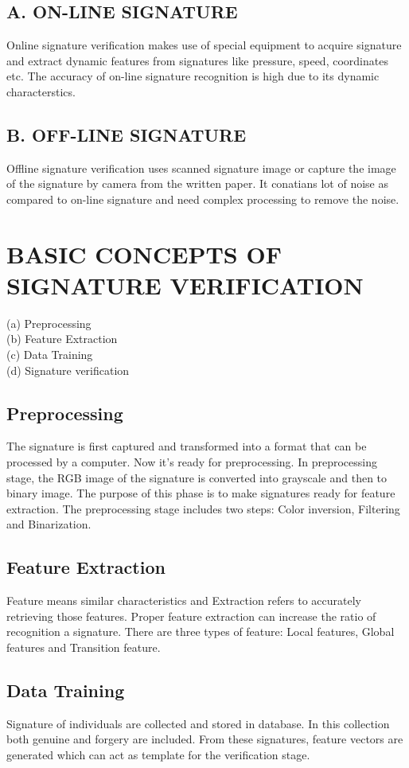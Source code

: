 \documentclass[]{article}
\begin{document}
	\subsection*{A. ON-LINE SIGNATURE}
	Online signature verification
	makes use of special equipment to acquire signature and
	extract dynamic features from signatures like pressure, speed, coordinates etc\cite{bib1}. The accuracy of on-line signature recognition is high due to its dynamic characterstics.
	\subsection*{B. OFF-LINE SIGNATURE}
	Offline signature verification uses scanned signature image or capture the image of the signature by camera from the written paper. It conatians lot of  noise as compared to on-line signature and need complex processing to remove the noise.
	\section{BASIC CONCEPTS OF SIGNATURE VERIFICATION}
	(a) Preprocessing\\
	(b) Feature Extraction\\
	(c) Data Training\\
	(d) Signature verification\\
	\subsection{Preprocessing\cite{bib2}}
	The signature is first captured and transformed into a format that can be processed by a computer. Now it’s ready for preprocessing. In preprocessing stage, the RGB image of the signature is converted into grayscale and then to binary image. The purpose of this phase is to make signatures ready for feature extraction. The preprocessing stage includes two steps: Color inversion, Filtering and Binarization.
	\subsection{Feature Extraction}
	Feature means similar characteristics and Extraction refers to accurately retrieving those features. Proper feature extraction can increase the ratio of recognition a signature. There are three types of feature: Local features, Global features and Transition feature.
	\subsection{Data Training}
	Signature of individuals are collected and stored in database. In this collection  both genuine and forgery are included. From these signatures, feature vectors are generated which can act as template for the verification stage.
\end{document}
